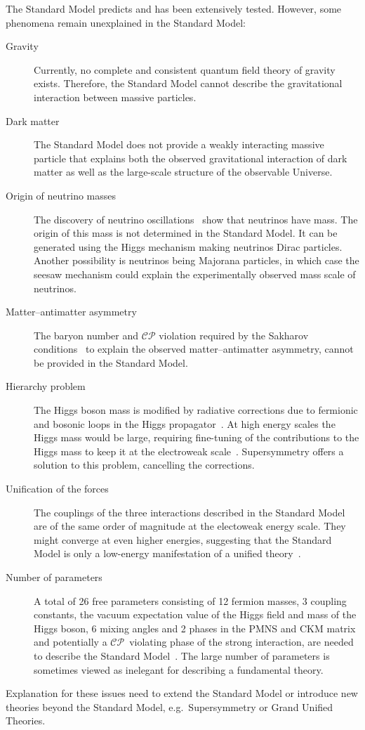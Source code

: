 The Standard Model predicts and has been extensively tested. However, some
phenomena remain unexplained in the Standard Model:
\begin{description}
\item[Gravity] Currently, no complete and consistent quantum field theory of
  gravity exists. Therefore, the Standard Model cannot describe the
  gravitational interaction between massive particles.

\item[Dark matter] The Standard Model does not provide a weakly interacting
  massive particle that explains both the observed gravitational interaction of
  dark matter as well as the large-scale structure of the observable Universe.

\item[Origin of neutrino masses] The discovery of neutrino
  oscillations~\cite{superk_neutrino, sno_neutrino_1, sno_neutrino_2} show that
  neutrinos have mass. The origin of this mass is not determined in the Standard
  Model. It can be generated using the Higgs mechanism making neutrinos Dirac
  particles. Another possibility is neutrinos being Majorana particles, in which
  case the seesaw mechanism could explain the experimentally observed mass scale
  of neutrinos.

\item[Matter--antimatter asymmetry] The baryon number and $\mathcal{CP}$
  violation required by the Sakharov conditions~\cite{sakharov} to explain the
  observed matter--antimatter asymmetry, cannot be provided in the Standard
  Model.

\item[Hierarchy problem] The Higgs boson mass is modified by radiative
  corrections due to fermionic and bosonic loops in the Higgs
  propagator~\cite{bettini}. At high energy scales the Higgs mass would be
  large, requiring fine-tuning of the contributions to the Higgs mass to keep it
  at the electroweak scale~\cite{thomson}. Supersymmetry offers a solution to
  this problem, cancelling the corrections.

\item[Unification of the forces] The couplings of the three interactions
  described in the Standard Model are of the same order of magnitude at the
  electoweak energy scale. They might converge at even higher energies,
  suggesting that the Standard Model is only a low-energy manifestation of a
  unified theory~\cite{thomson}.

\item[Number of parameters] A total of 26 free parameters consisting of 12
  fermion masses, 3 coupling constants, the vacuum expectation value of the
  Higgs field and mass of the Higgs boson, 6 mixing angles and 2 phases in the
  PMNS and CKM matrix and potentially a $\mathcal{CP}$~violating phase of the
  strong interaction, are needed to describe the Standard Model~\cite{thomson}.
  The large number of parameters is sometimes viewed as inelegant for describing
  a fundamental theory.
\end{description}
Explanation for these issues need to extend the Standard Model or introduce new
theories beyond the Standard Model, e.g.\ Supersymmetry or Grand Unified
Theories.

